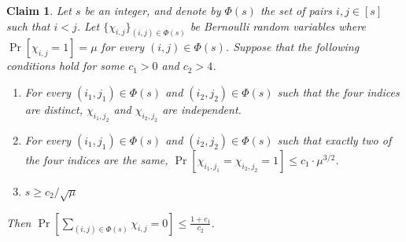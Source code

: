 \documentclass{article}
\newtheorem{claim}[lemma]{Claim}
\newcommand{\commentt}[1]{ {}}
\begin{document}

\iffalse
\begin{claim}\label{clm:cheb1}
Let $s$ be an integer, and denote by $\Phi(s)$ the set of pairs $i,j\in [s]$ such that $i<j$.
Let $\{\chi_{i,j}\}_{(i,j)\in \Phi(s)}$ be Bernoulli random variables where
 $\Pr[\chi_{i,j} = 1] = \mu$ for every $(i,j)\in \Phi(s)$. Suppose that the following conditions hold
 for some $c_1>0$ and $c_2 > 4$.
\begin{enumerate}
\item For every $(i_1,j_1)\in \Phi(s)$ and $(i_2,j_2)\in \Phi(s)$ such that the four indices are distinct, $\chi_{i_1,j_2}$ and $\chi_{i_2,j_2}$ are independent.
\item For every $(i_1,j_1)\in \Phi(s)$ and $(i_2,j_2)\in \Phi(s)$  such that exactly two of the four indices are the same,
$\Pr[\chi_{i_1,j_1}=\chi_{i_2,j_2} = 1] \leq c_1\cdot \mu^{3/2}$.
\item %
   $s \geq c_2/\sqrt{\mu}$
\end{enumerate}
Then $\Pr\left[ \sum_{(i,j)\in \Phi(s)} \chi_{i,j} = 0\right] \leq \frac{1+c_1}{c_2}$.
\end{claim}
\end{document}
